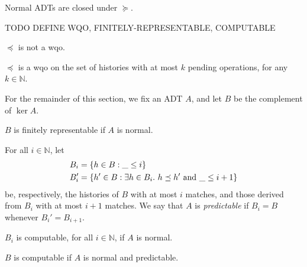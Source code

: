 \begin{lemma}

  Normal ADTs are closed under $\succeq$.

\end{lemma}

TODO DEFINE WQO, FINITELY-REPRESENTABLE, COMPUTABLE

\begin{example}

  $\preceq$ is not a wqo.

\end{example}

\begin{lemma}

  $\preceq$ is a wqo on the set of histories with at most $k$ pending
  operations, for any $k \in \mathbb{N}$.

\end{lemma}

For the remainder of this section, we fix an ADT $A$, and let $B$ be the
complement of $\ker A$.

\begin{lemma}

  $B$ is finitely representable if $A$ is normal.

\end{lemma}

For all $i \in \mathbb{N}$, let
\begin{align*}
  B_i &= {\{{ h \in B : \_ \le i }\}} \\
  B_i' &= {\{{ h' \in B :
    \exists h \in B_i.\ h \preceq h' \text{ and } \_ \le i+1
  }\}}
\end{align*}
be, respectively, the histories of $B$ with at most $i$ matches, and those
derived from $B_i$ with at most $i\!+\!1$ matches. We say that $A$ is
\emph{predictable} if $B_i = B$ whenever $B_i' = B_{i+1}$.

\begin{lemma}

  $B_i$ is computable, for all $i \in \mathbb{N}$, if $A$ is normal.

\end{lemma}

\begin{lemma}

  $B$ is computable if $A$ is normal and predictable.

\end{lemma}
